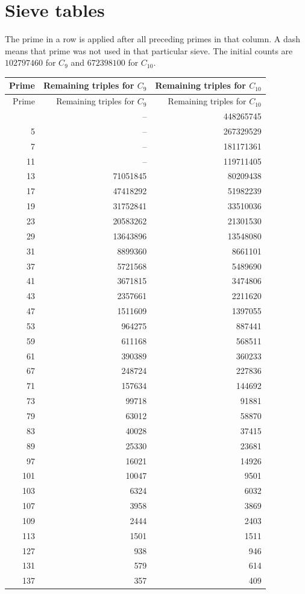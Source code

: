 \documentclass[11pt,reqno,letterpaper]{amsart}
\theoremstyle{definition}
\numberwithin{equation}{section}
\begin{document}
\clearpage
\section{Sieve tables}\label{app:sievetables}
The prime in a row is applied after all preceding primes in that column.
A dash means that prime was not used in that particular sieve.
The initial counts are $102797460$ for $C_9$ and $672398100$ for $C_{10}$.
\begin{longtable}{rrr}
\toprule Prime&Remaining triples for $C_9$&Remaining triples for $C_{10}$\\\midrule
\endfirsthead
\toprule Prime&Remaining triples for $C_9$&Remaining triples for $C_{10}$\\\midrule\endhead
\bottomrule\endfoot
3&--&448265745\\
5&--&267329529\\
7&--&181171361\\
11&--&119711405\\
13&71051845&80209438\\
17&47418292&51982239\\
19&31752841&33510036\\
23&20583262&21301530\\
29&13643896&13548080\\
31&8899360&8661101\\
37&5721568&5489690\\
41&3671815&3474806\\
43&2357661&2211620\\
47&1511609&1397055\\
53&964275&887441\\
59&611168&568511\\
61&390389&360233\\
67&248724&227836\\
71&157634&144692\\
73&99718&91881\\
79&63012&58870\\
83&40028&37415\\
89&25330&23681\\
97&16021&14926\\
101&10047&9501\\
103&6324&6032\\
107&3958&3869\\
109&2444&2403\\
113&1501&1511\\
127&938&946\\
131&579&614\\
137&357&409\\

\end{longtable}
\end{document}
